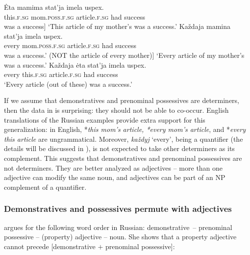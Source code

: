 \documentclass[output=paper,
colorlinks,
citecolor=brown,
newtxmath
]{langscibook}
\begin{document}
\ea\label{statja}
\ea\label{etastatja}
    \gll Ėta mamima stat'ja imela uspex.\\
    this.\textsc{f.sg} mom.\textsc{poss.f.sg} article.\textsc{f.sg} had success\\
    \glt [Literally: This [mom's article] was a success]
    \glt `This article of my mother's was a success.'
\ex\label{kazdajastatja}
    \gll Každaja mamina stat'ja imela uspex.\\
    every mom.\textsc{poss.f.sg} article.\textsc{f.sg} had success\\
    \glt [Literally: every [mom’s-article] was a success.' (NOT the article of every mother)]
    \glt `Every article of my mother's was a success.' 
\ex\label{kazdajaeta}
    \gll Každaja ėta stat'ja imela uspex.\\
    every this.\textsc{f.sg} article.\textsc{f.sg} had success\\
    \glt `Every article (out of these) was a success.'
\z\z

\noindent If we assume that demonstratives and prenominal possessives are determiners, then the data in  is surprising: they should not be able to co-occur. English translations of the Russian examples provide extra support for this generalization: in English, *\textit{this mom's article, *every mom's article}, and *\textit{every this article} are ungrammatical. Moreover, \textit{každyj} `every', being a quantifier (the details will be discussed in ), is not expected to take other determiners as its complement. This suggests that demonstratives and prenominal possessives are not determiners. They are better analyzed as adjectives -- more than one adjective can modify the same noun, and adjectives can be part of an NP complement of a quantifier. 


\subsubsection{Demonstratives and possessives permute with adjectives}

\citet{Pereltsvaig2007} %
argues for the following word order in Russian: demonstrative~-- prenominal possessive -- (property) adjective -- noun. She shows that a property adjective cannot precede [demonstrative $+$ prenominal possessive]:


\ea\label{Vanja}
\z\z
\end{document}
